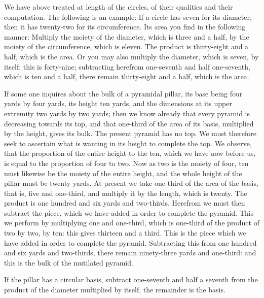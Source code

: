 We have above treated at length of the circles, of their qualities and their computation. The following is an example: If a circle has seven for its diameter, then it has twenty-two for its circumference. Its area you find in the following manner: Multiply the moiety of the diameter, which is three and a half, by the moiety of the circumference, which is eleven. The product is thirty-eight and a half, which is the area. Or you may also multiply the diameter, which is seven, by itself: this is forty-nine; subtracting herefrom one-seventh and half one-seventh, which is ten and a half, there remain thirty-eight and a half, which is the area.

If some one inquires about the bulk of a pyramidal pillar, its base being four yards by four yards, its height ten yards, and the dimensions at its upper extremity two yards by two yards; then we know already that every pyramid is decreasing towards its top, and that one-third of the area of its basis, multiplied by the height, gives its bulk. The present pyramid has no top. We must therefore seek to ascertain what is wanting in its height to complete the top. We observe, that the proportion of the entire height to the ten, which we have now before us, is equal to the proportion of four to two. Now as two is the moiety of four, ten must likewise be the moiety of the entire height, and the whole height of the pillar must be twenty yards. At present we take one-third of the area of the basis, that is, five and one-third, and multiply it by the length, which is twenty. The product is one hundred and six yards and two-thirds. Herefrom we must then subtract the piece, which we have added in order to complete the pyramid. This we perform by multiplying one and one-third, which is one-third of the product of two by two, by ten: this gives thirteen and a third. This is the piece which we have added in order to complete the pyramid. Subtracting this from one hundred and six yards and two-thirds, there remain ninety-three yards and one-third: and this is the bulk of the mutilated pyramid.

If the pillar has a circular basis, subtract one-seventh and half a seventh from the product of the diameter multiplied by itself, the remainder is the basis.

